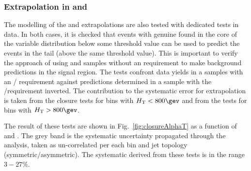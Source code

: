 \subsubsection*{Extrapolation in \alphat and \bdphi}
\label{sec:tfSyst_alphaT}
The modelling of the \alphat and
\bdphi extrapolations are also tested with dedicated tests in data. 
In both cases, it is checked that events with genuine \met found in the core
of the variable distribution below some threshold value can be used to
predict the events in the tail (above the same threshold value).
This is important to verify the
approach of using \mj and \mmj samples without an \alphat requirement
to make background predictions in the signal region. The tests
confront data yields in a \mj  samples with an \alphat /\bdphi
requirement against predictions determined in a \mj sample with
the \alphat /\bdphi requirement inverted. 
The contribution to the systematic error for \met extrapolation is taken
from the \alphat closure tests for bins with $\scalht<800\gev$ and from 
the \bdphi tests for bins with $\scalht>800\gev$. 

The result of these tests are shown in Fig.~\ref{fig:closureAlphaT} as a function of \scalht and \njet. 
The grey band is the systematic uncertainty propagated through the analysis, 
taken as un-correlated per each \scalht bin and jet topology
(symmetric/asymmetric). The systematic derived from these tests is
in the range $3-27\%$.


